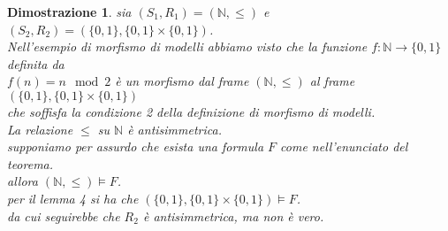 \documentclass[a4paper,12pt]{article}
\theoremstyle{def}
\theoremstyle{prop}
\theoremstyle{esempio}
\theoremstyle{dimostrazione}
\newtheorem*{dimostrazione}{Dimostrazione}
\theoremstyle{teo}
\theoremstyle{osservazione}
\begin{document}
\begin{dimostrazione}
	sia \((S_1,R_1) = (\mathbb{N},\leq)\) e \((S_2, R_2) = (\{0,1\}, \{0,1\} \times \{0,1\})\).\\
	Nell'esempio di morfismo di modelli abbiamo visto che la funzione \(f: \mathbb{N} \rightarrow \{0,1\}\) definita da\\
	\(f(n) = n \mod 2\) è un morfismo dal frame \((\mathbb{N},\leq)\) al frame \((\{0,1\}, \{0,1\} \times \{0,1\})\)\\
	che soffisfa la condizione 2 della definizione di morfismo di modelli.\\
	La relazione \(\leq\) su \(\mathbb{N}\) è antisimmetrica.\\
	supponiamo per assurdo che esista una formula \(F\) come nell'enunciato del teorema.\\
	allora \((\mathbb{N},\leq) \vDash F\).\\
	per il lemma 4 si ha che \((\{0,1\}, \{0,1\} \times \{0,1\}) \vDash F\).\\
	da cui seguirebbe che \(R_2\) è antisimmetrica, ma non è vero.
\end{dimostrazione}
\newpage
\end{document}
